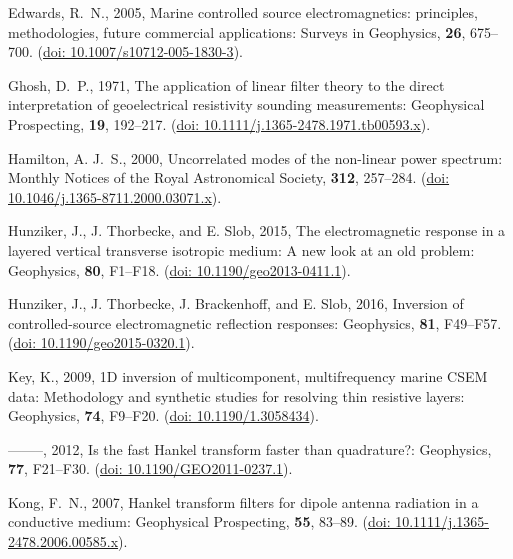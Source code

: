 \documentclass[manuscript,revised]{geophysics}
\begin{document}
\begin{thebibliography}{}
Edwards, R.~N., 2005, Marine controlled source electromagnetics: principles,
  methodologies, future commercial applications: Surveys in Geophysics, {\bf
  26}, 675--700.
\newblock (\href{http://dx.doi.org/10.1007/s10712-005-1830-3}{doi:
  10.1007/s10712-005-1830-3}).

Ghosh, D.~P., 1971, The application of linear filter theory to the direct
  interpretation of geoelectrical resistivity sounding measurements:
  Geophysical Prospecting, {\bf 19}, 192--217.
\newblock (\href{http://dx.doi.org/10.1111/j.1365-2478.1971.tb00593.x}{doi:
  10.1111/j.1365-2478.1971.tb00593.x}).

Hamilton, A. J.~S., 2000, Uncorrelated modes of the non-linear power spectrum:
  Monthly Notices of the Royal Astronomical Society, {\bf 312}, 257--284.
\newblock (\href{http://dx.doi.org/10.1046/j.1365-8711.2000.03071.x}{doi:
  10.1046/j.1365-8711.2000.03071.x}).

Hunziker, J., J. Thorbecke, and E. Slob, 2015, The electromagnetic response in
  a layered vertical transverse isotropic medium: {A} new look at an old
  problem: Geophysics, {\bf 80}, F1--F18.
\newblock (\href{http://dx.doi.org/10.1190/geo2013-0411.1}{doi:
  10.1190/geo2013-0411.1}).

Hunziker, J., J. Thorbecke, J. Brackenhoff, and E. Slob, 2016, Inversion of
  controlled-source electromagnetic reflection responses: Geophysics, {\bf 81},
  F49--F57.
\newblock (\href{http://dx.doi.org/10.1190/geo2015-0320.1}{doi:
  10.1190/geo2015-0320.1}).

Key, K., 2009, {1D} inversion of multicomponent, multifrequency marine {CSEM}
  data: {M}ethodology and synthetic studies for resolving thin resistive
  layers: Geophysics, {\bf 74}, F9--F20.
\newblock (\href{http://dx.doi.org/10.1190/1.3058434}{doi: 10.1190/1.3058434}).

--------, 2012, Is the fast {H}ankel transform faster than quadrature?:
  Geophysics, {\bf 77}, F21--F30.
\newblock (\href{http://dx.doi.org/10.1190/GEO2011-0237.1}{doi:
  10.1190/GEO2011-0237.1}).

Kong, F.~N., 2007, Hankel transform filters for dipole antenna radiation in a
  conductive medium: Geophysical Prospecting, {\bf 55}, 83--89.
\newblock (\href{http://dx.doi.org/10.1111/j.1365-2478.2006.00585.x}{doi:
  10.1111/j.1365-2478.2006.00585.x}).


\end{thebibliography}
\end{document}
